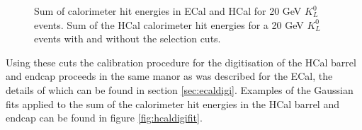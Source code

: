 \begin{figure}[h!]
\caption[\protect{} Sum of calorimeter hit energies in ECal and HCal for 20 GeV $K^{0}_{L}$ events.  \protect{} Sum of the HCal calorimeter hit energies for a 20 GeV $K^{0}_{L}$ events with and without the selection cuts.]{\protect{} Sum of calorimeter hit energies in ECal and HCal for 20 GeV $K^{0}_{L}$ events.  \protect{} Sum of the HCal calorimeter hit energies for a 20 GeV $K^{0}_{L}$ events with and without the selection cuts.}
\label{fig:hcaldigi}
\end{figure}

Using these cuts the calibration procedure for the digitisation of the HCal barrel and endcap proceeds in the same manor as was described for the ECal, the details of which can be found in section \ref{sec:ecaldigi}.  Examples of the Gaussian fits applied to the sum of the calorimeter hit energies in the HCal barrel and endcap can be found in figure \ref{fig:hcaldigifit}.  

